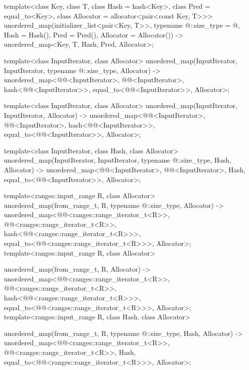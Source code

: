 \documentclass{wg21}
\begin{document}
\begin{codeblock}

template<class Key, class T, class Hash = hash<Key>,
class Pred = equal_to<Key>, class Allocator = allocator<pair<const Key, T>>>
unordered_map(initializer_list<pair<Key, T>>,
typename @\seebelow@::size_type = @\seebelow@, Hash = Hash(),
Pred = Pred(), Allocator = Allocator())
-> unordered_map<Key, T, Hash, Pred, Allocator>;

template<class InputIterator, class Allocator>
unordered_map(InputIterator, InputIterator, typename @\seebelow@::size_type, Allocator)
-> unordered_map<@@<InputIterator>, @@<InputIterator>,
hash<@@<InputIterator>>,
equal_to<@@<InputIterator>>, Allocator>;

template<class InputIterator, class Allocator>
unordered_map(InputIterator, InputIterator, Allocator)
-> unordered_map<@@<InputIterator>, @@<InputIterator>,
hash<@@<InputIterator>>,
equal_to<@@<InputIterator>>, Allocator>;

template<class InputIterator, class Hash, class Allocator>
unordered_map(InputIterator, InputIterator, typename @\seebelow@::size_type, Hash, Allocator)
-> unordered_map<@@<InputIterator>, @@<InputIterator>, Hash,
equal_to<@@<InputIterator>>, Allocator>;


\end{codeblock}
\begin{addedblock}
\begin{codeblock}
template<ranges::input_range R, class Allocator>
unordered_map(from_range_t, R, typename @\seebelow@::size_type, Allocator)
-> unordered_map<@@<ranges::range_iterator_t<R>>,
        @@<ranges::range_iterator_t<R>>,
        hash<@@<ranges::range_iterator_t<R>>>,
        equal_to<@@<ranges::range_iterator_t<R>>>, Allocator>;
template<ranges::input_range R, class Allocator>

unordered_map(from_range_t, R, Allocator)
-> unordered_map<@@<ranges::range_iterator_t<R>>,
    @@<ranges::range_iterator_t<R>>,
    hash<@@<ranges::range_iterator_t<R>>>,
    equal_to<@@<ranges::range_iterator_t<R>>>, Allocator>;
template<ranges::input_range R, class Hash, class Allocator>

unordered_map(from_range_t, R, typename @\seebelow@::size_type, Hash, Allocator)
-> unordered_map<@@<ranges::range_iterator_t<R>>,
    @@<ranges::range_iterator_t<R>>,
    Hash,
    equal_to<@@<ranges::range_iterator_t<R>>>, Allocator>;
\end{codeblock}
\end{addedblock}
\end{document}
